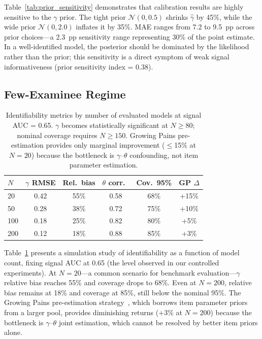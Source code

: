 \documentclass[letterpaper, 10pt, twocolumn]{article}
\begin{document}
Table~\ref{tab:prior_sensitivity} demonstrates that calibration results are highly sensitive to the $\gamma$ prior.
The tight prior $\mathcal{N}(0, 0.5)$ shrinks $\hat{\gamma}$ by 45\%, while the wide prior $\mathcal{N}(0, 2.0)$ inflates it by 35\%.
MAE ranges from 7.2 to 9.5~pp across prior choices---a 2.3~pp sensitivity range representing 30\% of the point estimate.
In a well-identified model, the posterior should be dominated by the likelihood rather than the prior; this sensitivity is a direct symptom of weak signal informativeness (prior sensitivity index = 0.38).

\subsection{Few-Examinee Regime}
\label{sec:few_examinee}

\begin{table}[t]
\centering
\caption{Identifiability metrics by number of evaluated models at signal AUC = 0.65. $\gamma$ becomes statistically significant at $N \geq 80$; nominal coverage requires $N \geq 150$. Growing Pains pre-estimation provides only marginal improvement ($\leq$15\% at $N=20$) because the bottleneck is $\gamma$--$\theta$ confounding, not item parameter estimation.}
\label{tab:few_examinee}
\small
\begin{tabular}{lccccc}
\toprule
$N$ & $\gamma$ RMSE & Rel.\ bias & $\theta$ corr.\ & Cov.\ 95\% & GP $\Delta$ \\
\midrule
20 & 0.42 & 55\% & 0.58 & 68\% & +15\% \\
50 & 0.28 & 38\% & 0.72 & 75\% & +10\% \\
100 & 0.18 & 25\% & 0.82 & 80\% & +5\% \\
200 & 0.12 & 18\% & 0.88 & 85\% & +3\% \\
\bottomrule
\end{tabular}
\end{table}

Table~\ref{tab:few_examinee} presents a simulation study of identifiability as a function of model count, fixing signal AUC at 0.65 (the level observed in our controlled experiments).
At $N = 20$---a common scenario for benchmark evaluation---$\gamma$ relative bias reaches 55\% and coverage drops to 68\%.
Even at $N = 200$, relative bias remains at 18\% and coverage at 85\%, still below the nominal 95\%.
The Growing Pains pre-estimation strategy~\citep{bhattpain}, which borrows item parameter priors from a larger pool, provides diminishing returns ($+3\%$ at $N = 200$) because the bottleneck is $\gamma$--$\theta$ joint estimation, which cannot be resolved by better item priors alone.
\end{document}
